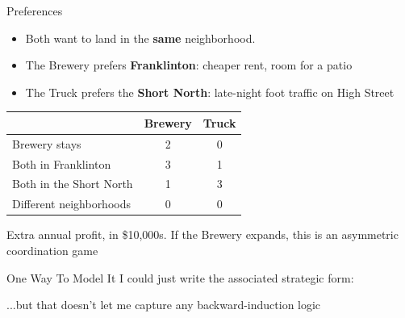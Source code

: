 \begin{frame}{Preferences}
\begin{itemize}
    \item Both want to land in the \textbf{same} neighborhood.
    \item The Brewery prefers \textbf{Franklinton}: cheaper rent, room for a patio
    \item The Truck prefers the \textbf{Short North}: late-night foot traffic on High Street
\end{itemize}
\bsk
\centering
\begin{tabular}{lcc}
\toprule
 & \textbf{Brewery} & \textbf{Truck} \\
\midrule
Brewery stays & 2 & 0 \\
Both in Franklinton & 3 & 1 \\
Both in the Short North & 1 & 3 \\
Different neighborhoods & 0 & 0 \\
\bottomrule
\end{tabular}
\bsk
\raggedright
{\footnotesize Extra annual profit, in \$10{,}000s.}
\vfill
If the Brewery expands, this is an asymmetric coordination game
\vspace{-0.3in}
\end{frame}

\begin{frame}{One Way To Model It}
I could just write the associated strategic form:
\begin{center}
    \begin{matrixgame}[top={Frkltn, ShrtNrth}, left={Stay Frkltn, Stay ShrtNrth,Expand Frkltn,Expand ShrtNrth}, player names={Brewery, Food Truck}]
\end{matrixgame}
\end{center}
...but that doesn't let me capture any backward-induction logic
\end{frame}

